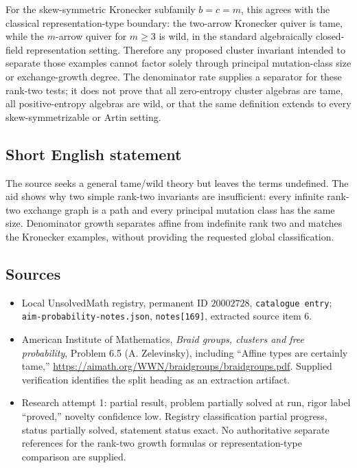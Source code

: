 \documentclass[11pt]{article}
\begin{document}
For the skew-symmetric Kronecker subfamily $b=c=m$, this agrees with the classical representation-type boundary: the two-arrow Kronecker quiver is tame, while the $m$-arrow quiver for $m\geq3$ is wild, in the standard algebraically closed-field representation setting. Therefore any proposed cluster invariant intended to separate those examples cannot factor solely through principal mutation-class size or exchange-growth degree. The denominator rate supplies a separator for these rank-two tests; it does not prove that all zero-entropy cluster algebras are tame, all positive-entropy algebras are wild, or that the same definition extends to every skew-symmetrizable or Artin setting.
\subsection{Short English statement}
The source seeks a general tame/wild theory but leaves the terms undefined. The aid shows why two simple rank-two invariants are insufficient: every infinite rank-two exchange graph is a path and every principal mutation class has the same size. Denominator growth separates affine from indefinite rank two and matches the Kronecker examples, without providing the requested global classification.
\subsection{Sources}
\begin{itemize}
\item Local UnsolvedMath registry, permanent ID $20002728$, \texttt{catalogue entry}; \texttt{aim-probability-notes.json}, \texttt{notes[169]}, extracted source item 6.
\item American Institute of Mathematics, \emph{Braid groups, clusters and free probability}, Problem 6.5 (A. Zelevinsky), including ``Affine types are certainly tame,'' \url{https://aimath.org/WWN/braidgroups/braidgroups.pdf}. Supplied verification identifies the split heading as an extraction artifact.
\item Research attempt 1: partial result, problem partially solved at run, rigor label ``proved,'' novelty confidence low. Registry classification partial progress, status partially solved, statement status exact. No authoritative separate references for the rank-two growth formulas or representation-type comparison are supplied.
\end{itemize}
\end{document}
